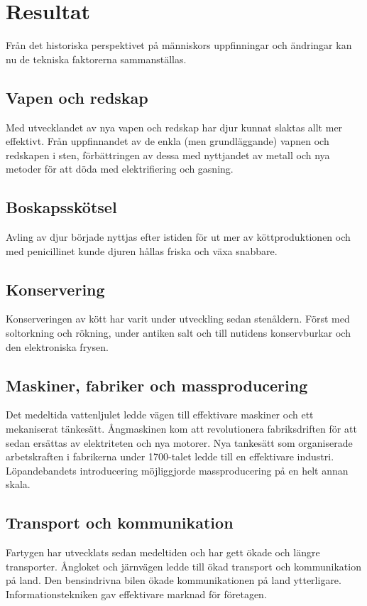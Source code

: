 \section{Resultat}
Från det historiska perspektivet på människors uppfinningar och ändringar kan nu de tekniska faktorerna sammanställas. 

\subsection{Vapen och redskap}
Med utvecklandet av nya vapen och redskap har djur kunnat slaktas allt mer effektivt. Från uppfinnandet av de enkla (men grundläggande) vapnen och redskapen i sten, förbättringen av dessa med nyttjandet av metall och nya metoder för att döda med elektrifiering och gasning. 

\subsection{Boskapsskötsel}
Avling av djur började nyttjas efter istiden för ut mer av köttproduktionen och med penicillinet kunde djuren hållas friska och växa snabbare.  

\subsection{Konservering}
Konserveringen av kött har varit under utveckling sedan stenåldern. Först med soltorkning och rökning, under antiken salt och till nutidens konservburkar och den elektroniska frysen.   

\subsection{Maskiner, fabriker och massproducering}
Det medeltida vattenljulet ledde vägen till effektivare maskiner och ett mekaniserat tänkesätt. Ångmaskinen kom att revolutionera fabriksdriften för att sedan ersättas av elektriteten och nya motorer. 
\newline
\newline
Nya tankesätt som organiserade arbetskraften i fabrikerna under 1700-talet ledde till en effektivare industri. Löpandebandets introducering möjliggjorde massproducering på en helt annan skala. 

\subsection{Transport och kommunikation}
Fartygen har utvecklats sedan medeltiden och har gett ökade och längre transporter. Ångloket och järnvägen ledde till ökad transport och kommunikation på land. Den bensindrivna bilen ökade kommunikationen på land ytterligare. 
\newline
\newline
Informationstekniken gav effektivare marknad för företagen. 

